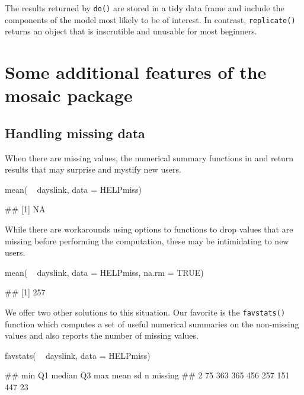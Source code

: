 \noindent
The results returned by \texttt{do()} are stored in a tidy data frame
and include the components of the model most likely to be of interest.
In contrast, \texttt{replicate()} returns an object that is inscrutible
and unusable for most beginners.

\section{Some additional features of the mosaic
package}\label{some-additional-features-of-the-mosaic-package}

\subsection{Handling missing data}\label{handling-missing-data}

When there are missing values, the numerical summary functions in
 and  return results that may surprise and mystify
new users.

\begin{Schunk}
\begin{Sinput}
mean( ~ dayslink, data = HELPmiss)
\end{Sinput}
\begin{Soutput}
## [1] NA
\end{Soutput}
\end{Schunk}

\noindent
While there are workarounds using options to functions to drop values
that are missing before performing the computation, these may be
intimidating to new users.

\begin{Schunk}
\begin{Sinput}
mean( ~ dayslink, data = HELPmiss, na.rm = TRUE)
\end{Sinput}
\begin{Soutput}
## [1] 257
\end{Soutput}
\end{Schunk}

We offer two other solutions to this situation. Our favorite is the
\texttt{favstats()} function which computes a set of useful numerical
summaries on the non-missing values and also reports the number of
missing values.

\begin{Schunk}
\begin{Sinput}
favstats( ~ dayslink, data = HELPmiss)
\end{Sinput}
\begin{Soutput}
##  min Q1 median  Q3 max mean  sd   n missing
##    2 75    363 365 456  257 151 447      23
\end{Soutput}
\end{Schunk}

